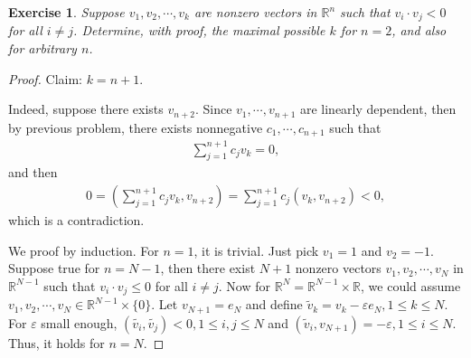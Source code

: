 \documentclass[11pt]{book}
\newtheorem{exercise}{Exercise}[section]
\theoremstyle{definition}
\numberwithin{equation}{chapter}
\begin{document}
\medskip

\begin{exercise} 
Suppose $v_1, v_2, \cdots, v_k$ are nonzero vectors in $\mathbb{R}^n$ such that $v_i \cdot v_j < 0$ for all $i \neq j$. Determine, with proof, the maximal possible $k$ for $n = 2$, and also for arbitrary $n$.
\end{exercise}
\begin{proof}
Claim: $k = n + 1$. 

Indeed, suppose there exists $v_{n+2}$. Since $v_1, \cdots, v_{n+1}$ are linearly dependent, then by previous problem, there exists nonnegative $c_1, \cdots, c_{n+1}$ such that
\begin{align*}
    \sum^{n+1}_{j=1} c_j v_k = 0,
\end{align*}
and then
\begin{align*}
    0 = \left(\sum^{n+1}_{j=1} c_j v_k, v_{n+2}\right) = \sum^{n+1}_{j=1} c_j \left(v_k, v_{n+2} \right) < 0,
\end{align*}
which is a contradiction. 

We proof by induction. For $n = 1$, it is trivial. Just pick $v_1 = 1$ and $v_2 = -1$. Suppose true for $n = N - 1$, then there exist $N+1$ nonzero vectors $v_1, v_2, \cdots, v_{N}$ in $\mathbb{R}^{N-1}$ such that $v_i \cdot v_j \leq 0$ for all $i \neq j$. Now for $\mathbb{R}^N = \mathbb{R}^{N-1} \times \mathbb{R}$, we could assume $v_1, v_2, \cdots, v_{N} \in \mathbb{R}^{N-1} \times \{0\}$. Let $v_{N+1} = e_N$ and define $\widetilde{v}_k = v_k - \varepsilon e_N, 1 \leq k \leq N$. For $\varepsilon$ small enough, $\left(\tilde{v_i}, \tilde{v_j}\right) < 0, 1 \leq i,j \leq N$ and $\left(\tilde{v}_i, v_{N+1} \right) = - \varepsilon, 1 \leq i \leq N$. Thus, it holds for $n = N$.
\end{proof}

\medskip
\end{document}
